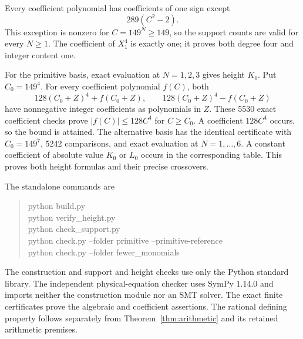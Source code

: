 \documentclass[11pt,a4paper]{article}
\begin{document}
Every coefficient polynomial has coefficients of one sign except
\[
                             289(C^2-2).
\]
This exception is nonzero for $C=149^N\ge149$, so the support counts are
valid for every $N\ge1$. The coefficient of $X_1^4$ is exactly one;
it proves both degree four and integer content one.

For the primitive basis, exact evaluation at $N=1,2,3$ gives height
$K_0$. Put $C_0=149^4$. For every coefficient polynomial $f(C)$, both
\[
                   128(C_0+Z)^4+f(C_0+Z),\qquad
                   128(C_0+Z)^4-f(C_0+Z)
\]
have nonnegative integer coefficients as polynomials in $Z$. These
5530 exact coefficient checks prove $|f(C)|\le128C^4$ for $C\ge C_0$.
A coefficient $128C^4$ occurs, so the bound is attained. The alternative
basis has the identical certificate with $C_0=149^7$, 5242 comparisons,
and exact evaluation at $N=1,\ldots,6$. A constant coefficient of absolute
value $K_0$ or $L_0$ occurs in the corresponding table. This proves both
height formulas and their precise crossovers.

The standalone commands are
\begin{quote}\ttfamily\raggedright
python build.py\\
python verify\_height.py\\
python check\_support.py\\
python check.py --folder primitive --primitive-reference\\
python check.py --folder fewer\_monomials
\end{quote}
The construction and support and height checks use only the Python
standard library. The independent physical-equation checker uses
SymPy 1.14.0 and imports neither the construction module nor an SMT
solver. The exact finite certificates prove the algebraic and coefficient
assertions. The rational defining property follows separately from
Theorem~\ref{thm:arithmetic} and its retained arithmetic premises.
\end{document}
